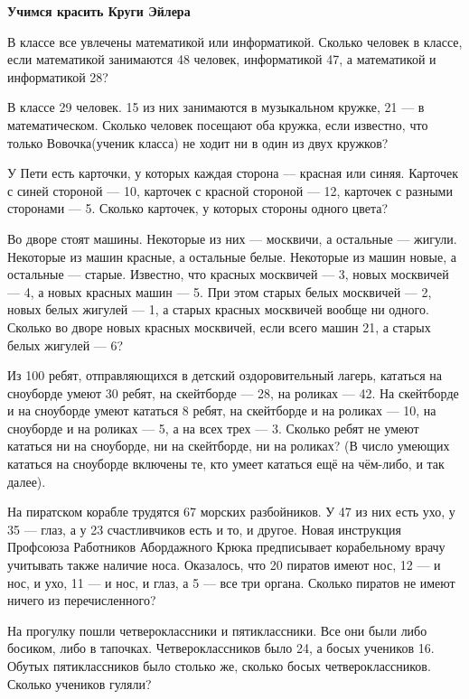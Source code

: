 \centerline{\bf \Huge Учимся красить Круги Эйлера}

 В классе все увлечены математикой или информатикой. Сколько
человек в классе, если математикой занимаются 48 человек, информатикой 47, а математикой
и информатикой 28?

 В классе 29 человек. 15 из них занимаются в музыкальном кружке, 21 — в математическом. Сколько человек посещают оба кружка, если известно, что только Вовочка(ученик класса) не ходит ни в один из двух кружков?

 У Пети есть карточки, у которых каждая сторона — красная или синяя.
Карточек с синей стороной — 10, карточек с красной стороной — 12, карточек
с разными сторонами — 5. Сколько карточек, у которых стороны одного цвета? 

 Во дворе стоят машины. Некоторые из них — москвичи, а остальные — жигули. Некоторые из машин красные, а остальные белые. Некоторые из машин новые, а остальные — старые. Известно, что красных москвичей — 3, новых москвичей — 4, а новых красных машин — 5. При этом старых белых москвичей — 2, новых белых жигулей — 1, а старых красных москвичей вообще ни одного. Сколько во дворе новых красных москвичей, если всего машин 21, а старых белых жигулей — 6?

 Из 100 ребят, отправляющихся в детский оздоровительный лагерь, кататься на сноуборде умеют 30 ребят, на скейтборде — 28, на роликах — 42. На скейтборде и на сноуборде умеют кататься 8 ребят, на скейтборде и на роликах — 10, на сноуборде и на роликах — 5, а на всех трех — 3. Сколько ребят не умеют кататься ни на сноуборде, ни на скейтборде, ни на роликах? (В число умеющих кататься на сноуборде включены те, кто умеет кататься ещё на чём-либо, и так далее).

 На пиратском корабле трудятся 67 морских разбойников. У 47 из них есть
ухо, у 35 — глаз, а у 23 счастливчиков есть и то, и другое. Новая инструкция
Профсоюза Работников Абордажного Крюка предписывает корабельному врачу
учитывать также наличие носа. Оказалось, что 20 пиратов имеют нос, 12 — и
нос, и ухо, 11 — и нос, и глаз, а 5 — все три органа. Сколько пиратов не имеют
ничего из перечисленного?

 На прогулку пошли четвероклассники и пятиклассники. Все они были либо
босиком, либо в тапочках. Четвероклассников было 24, а босых учеников 16.
Обутых пятиклассников было столько же, сколько босых четвероклассников.
Сколько учеников гуляли? 


